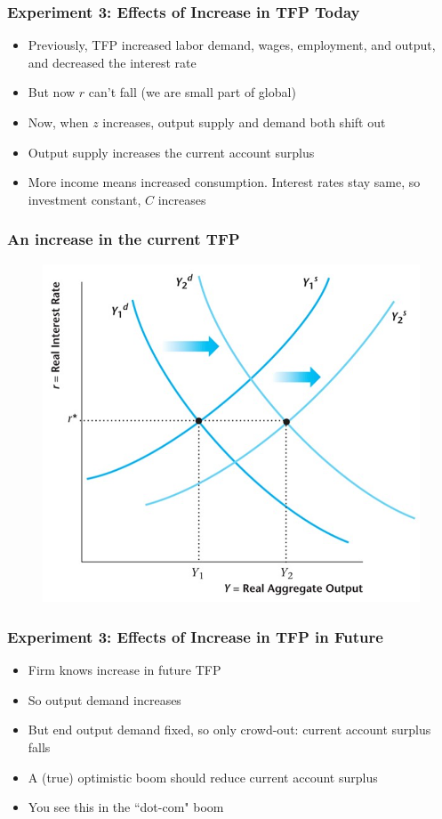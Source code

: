 \documentclass{beamer}
\begin{document}
\begin{frame}
\frametitle[alignment=center]{Experiment 3: Effects of Increase in TFP Today}
\begin{itemize}
\item Previously, TFP increased labor demand, wages, employment, and output, and decreased the interest rate
\bigskip
\item But now $r$ can't fall (we are small part of global)
\bigskip
\item Now, when $z$ increases, output supply and demand both shift out
\bigskip
\item Output supply increases the current account surplus
\bigskip
\item More income means increased consumption.  Interest rates stay same, so investment constant, $C$ increases
\end{itemize}
\end{frame}

\begin{frame}
\frametitle[alignment=center]{An increase in the current TFP}
\begin{figure}
\centering
\includegraphics[scale=0.55]{Figures/W_Fig_16pt10.png}
\end{figure}
\end{frame}

\begin{frame}
\frametitle[alignment=center]{Experiment 3: Effects of Increase in TFP in Future}
\begin{itemize}
\item Firm knows increase in future TFP
\bigskip
\item So output demand increases
\bigskip
\item But end output demand fixed, so only crowd-out: current account surplus falls
\bigskip
\item A (true) optimistic boom should reduce current account surplus
\bigskip
\item You see this in the ``dot-com" boom
\end{itemize}
\end{frame}
\end{document}
